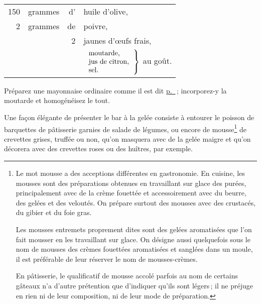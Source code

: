 \footnotesize
\begin{longtable}{rrrp{16em}}
    150 & grammes & d' & huile d'olive,                                                                   \\
      2 & grammes & de & poivre,                                                                          \\
        &         &  2 & jaunes d'œufs frais,                                                             \\
\setlength\tabcolsep{.15em}
        &         &    &  $\left.
                               \begin{tabular}{lll}
                                moutarde,             \\
                                jus de citron,        \\
                                sel.                  \\
                               \end{tabular}
                             \right\} $ au goût.
\end{longtable}
\normalsize

Préparez une mayonnaise ordinaire comme il est dit
\hyperlink{p0323-2}{p. \pageref{pg0323-2}} ; incorporez-y la moutarde et
homogénéisez le tout.

\sk

Une façon élégante de présenter le bar à la gelée consiste à entourer le
poisson de barquettes de pâtisserie garnies de salade de légumes, ou encore de
mousse\footnote{
Le mot mousse a des acceptions différentes en gastronomie. En
cuisine, les mousses sont des préparations obtenues en travaillant sur glace
des purées, principalement avec de la crème fouettée et accessoirement avec du
beurre, des gelées et des veloutés. On prépare surtout des mousses avec des
crustacés, du gibier et du foie gras.

Les mousses entremets proprement dites sont des gelées aromatisées que l'on
fait mousser en les travaillant sur glace. On désigne aussi quelquefois sous le
nom de mousses des crèmes fouettées aromatisées et sanglées dans un moule, il
est préférable de leur réserver le nom de mousses-crèmes.

En pâtisserie, le qualificatif de mousse accolé parfois au nom de certains
gâteaux n'a d'autre prétention que d'indiquer qu'ils sont légers ; il ne
préjuge en rien ni de leur composition, ni de leur mode de préparation.} de
crevettes grises, truffée ou non, qu'on masquera avec de la gelée maigre et
qu'on décorera avec des crevettes roses ou des huîtres, par exemple.

